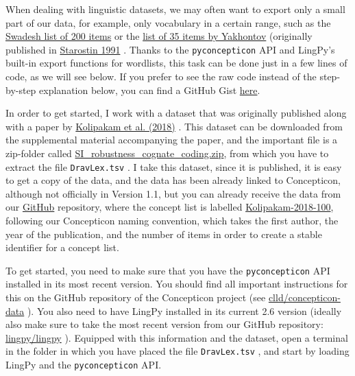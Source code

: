 \documentclass[
  english,
  a4paper,
  oneside,tablecaptionabove
]{scrbook}
\newcommand{\passthrough}[1]{#1}
\begin{document}
When dealing with linguistic datasets, we may often want to export only
a small part of our data, for example, only vocabulary in a certain
range, such as the
\href{http://concepticon.clld.org/contributions/Swadesh-1952-200}{Swadesh
list of 200 items} or the
\href{http://concepticon.clld.org/contributions/Yakhontov-1991-35}{list
of 35 items by Yakhontov} (originally published in
\href{http://bibliography.lingpy.org?key=Starostin1991}{Starostin 1991}
. Thanks to the \passthrough{\lstinline!pyconcepticon!} API and LingPy's
built-in export functions for wordlists, this task can be done just in a
few lines of code, as we will see below. If you prefer to see the raw
code instead of the step-by-step explanation below, you can find a
GitHub Gist
\href{https://gist.github.com/LinguList/7804cb127e74a9263b4eab9c5af4bc6f}{here}.

In order to get started, I work with a dataset that was originally
published along with a paper by
\href{http://bibliography.lingpy.org?key=Kolipakam2018}{Kolipakam et al.
(2018)} . This dataset can be downloaded from the supplemental material
accompanying the paper, and the important file is a zip-folder called
\href{http://rsos.royalsocietypublishing.org/highwire/filestream/18890/field_highwire_adjunct_files/3/rsos171504supp4.zip}{SI\_robustness\_cognate\_coding.zip},
from which you have to extract the file
\passthrough{\lstinline!DravLex.tsv!} . I take this dataset, since it is
published, it is easy to get a copy of the data, and the data has been
already linked to Concepticon, although not officially in Version 1.1,
but you can already receive the data from our
\href{https://github.com/clld/concepticon-data}{GitHub} repository,
where the concept list is labelled
\href{https://github.com/clld/concepticon-data/blob/master/concepticondata/conceptlists/Kolipakam-2018-100.tsv}{Kolipakam-2018-100},
following our Concepticon naming convention, which takes the first
author, the year of the publication, and the number of items in order to
create a stable identifier for a concept list.

To get started, you need to make sure that you have the
\passthrough{\lstinline!pyconcepticon!} API installed in its most recent
version. You should find all important instructions for this on the
GitHub repository of the Concepticon project (see
\href{https://github.com/clld/concepticon-data}{clld/concepticon-data}
). You also need to have LingPy installed in its current 2.6 version
(ideally also make sure to take the most recent version from our GitHub
repository: \href{https://github.com/lingpy/lingpy}{lingpy/lingpy} ).
Equipped with this information and the dataset, open a terminal in the
folder in which you have placed the file
\passthrough{\lstinline!DravLex.tsv!} , and start by loading LingPy and
the \passthrough{\lstinline!pyconcepticon!} API.
\end{document}
